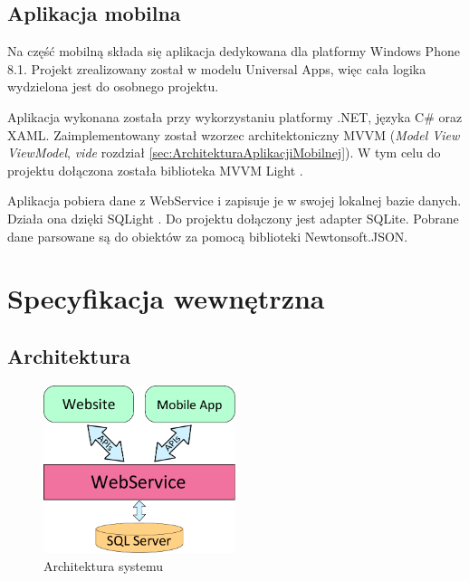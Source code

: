 \documentclass[a4paper]{book}
\begin{document}
		\section{Aplikacja mobilna}		
	
		Na część mobilną składa się aplikacja dedykowana dla platformy Windows Phone 8.1. Projekt zrealizowany został w modelu Universal Apps, więc cała logika wydzielona jest do osobnego projektu.
		
		Aplikacja wykonana została przy wykorzystaniu platformy .NET, języka C\# oraz XAML. Zaimplementowany został wzorzec architektoniczny MVVM (\emph{Model View ViewModel}, \emph{vide} rozdział \ref{sec:ArchitekturaAplikacjiMobilnej}). W tym celu do projektu dołączona została biblioteka MVVM Light \cite{id:MVVMLight}. 
		
		Aplikacja pobiera dane z WebService i zapisuje je w swojej lokalnej bazie danych. Działa ona dzięki SQLight \cite{id:SQLite}. Do projektu dołączony jest adapter SQLite. Pobrane dane parsowane są do obiektów za pomocą biblioteki Newtonsoft.JSON.




	\chapter{Specyfikacja wewnętrzna}
	\label{id:cha:specyfikacja_wewnetrzna}
	
		\section{Architektura}
		
		\begin{figure}		
			\centering
			\includegraphics[width=0.5\textwidth]{images/architektura.pdf}
			\caption{Architektura systemu}
			\label{fig:architektura}
		\end{figure}
		
\end{document}

